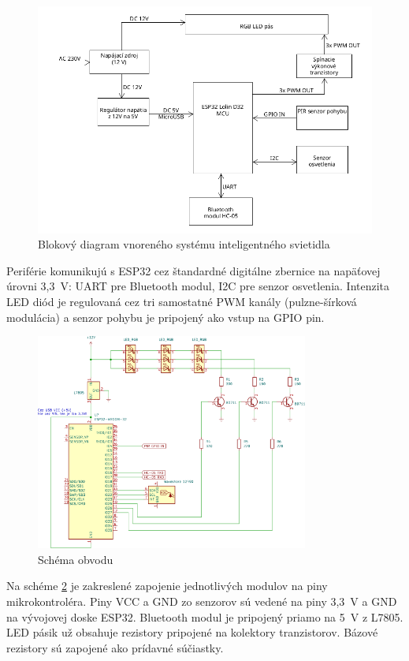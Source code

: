 \documentclass[12pt, a4paper]{article}
\begin{document}
\begin{figure}[h]
	\centering
	\includegraphics[width=\textwidth]{assets/block-diagram.png}
	\caption{Blokový diagram vnoreného systému inteligentného svietidla}
	\label{fig:block-diagram}
\end{figure}

Periférie komunikujú s ESP32 cez štandardné digitálne zbernice na napäťovej úrovni 3,3~V: UART pre Bluetooth modul, I2C pre senzor osvetlenia. Intenzita LED diód je regulovaná cez tri samostatné PWM kanály (pulzne-šírková modulácia) a senzor pohybu je pripojený ako vstup na GPIO pin.

\begin{figure}[h]
	\centering
	\includegraphics[width=0.8\textwidth]{assets/electrical-schematics.png}
	\caption{Schéma obvodu}
	\label{fig:electrical}
\end{figure}
Na schéme \ref{fig:electrical} je zakreslené zapojenie jednotlivých modulov na piny mikrokontroléra. Piny VCC a GND zo senzorov sú vedené na piny 3,3~V a GND na vývojovej doske ESP32. Bluetooth modul je pripojený priamo na 5~V z L7805. LED pásik už obsahuje rezistory pripojené na kolektory tranzistorov. Bázové rezistory sú zapojené ako prídavné súčiastky.
\end{document}
